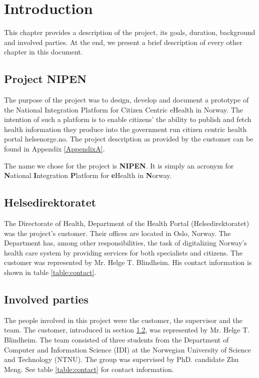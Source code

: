 
\chapter{Introduction} 
\label{Introduction} 


This chapter provides a description of the project, its goals, duration, background and involved parties.
At the end, we present a brief description of every other chapter in this document.

\section{Project NIPEN}
\label{section:description}

The purpose of the project was to design, develop and document a prototype of the National Integration Platform
for Citizen Centric eHealth in Norway.
The intention of such a platform is to enable citizens’ the ability to publish and fetch health information they produce
into the government run citizen centric health portal helsenorge.no.
The project description as provided by the customer can be found in Appendix \ref{AppendixA}.

The name we chose for the project is \textbf{NIPEN}.\newline
It is simply an acronym for \textbf{N}ational \textbf{I}ntegration \textbf{P}latform for \textbf{e}Health
in \textbf{N}orway.

\section{Helsedirektoratet}
\label{section:customer}

The Directorate of Health, Department of the Health Portal (Helsedirektoratet) was the project's customer.
Their offices are located in Oslo, Norway. 
The Department has, among other responsibilities, the task of digitalizing Norway's health care system by providing
services for both specialists and citizens. The customer was represented by Mr. Helge T. Blindheim.
His contact information is shown in table \ref{table:contact}.

\section{Involved parties}
\label{section:parties}

The people involved in this project were the customer, the supervisor and the team.
The customer, introduced in section \ref{section:customer}, was represented by Mr. Helge T. Blindheim.
The team consisted of three students from the Department of Computer and Information Science (IDI) at the Norwegian University of Science and Technology (NTNU). The group was supervised by PhD. candidate Zhu Meng.
See table \ref{table:contact} for contact information.

